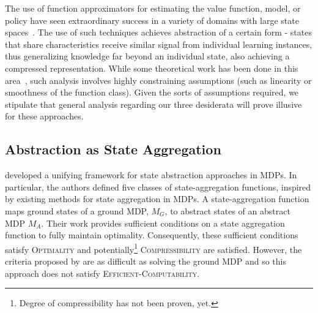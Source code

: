The use of function approximators for estimating the value function, model, or policy have seen extraordinary success in a variety of domains with large state spaces~\cite{mnih2015human,sutton1999policy,baird1995residual,stadie2015incentivizing,ormoneit2002kernel}. The use of such techniques achieves abstraction of a certain form - states that share characteristics receive similar signal from individual learning instances, thus generalizing knowledge far beyond an individual state, also achieving a compressed representation. While some theoretical work has been done in this area~\cite{schoknecht2002optimality,thrun1993issues,parr2008analysis}, such analysis involves highly constraining assumptions (such as linearity or smoothness of the function class). Given the sorts of assumptions required, we stipulate that general analysis regarding our three desiderata will prove illusive for these approaches.

\subsection{Abstraction as State Aggregation}

\citet{li2006towards} developed a unifying framework for state abstraction approaches in \acp{MDP}. In particular, the authors defined five classes of state-aggregation functions, inspired by existing methods for state aggregation in \acp{MDP}. A state-aggregation function maps ground states of a ground MDP, $M_G$, to abstract states of an abstract MDP $M_A$. Their work provides sufficient conditions on a state aggregation function to fully maintain optimality. Consequently, these sufficient conditions satisfy \textsc{Optimality} and potentially\footnote{Degree of compressibility has not been proven, yet.} \textsc{Compressibility} are satisfied. However, the criteria proposed by \cite{li2006towards} are as difficult as solving the ground \ac{MDP} and so this approach does not satisfy \textsc{Efficient-Computability}. 

